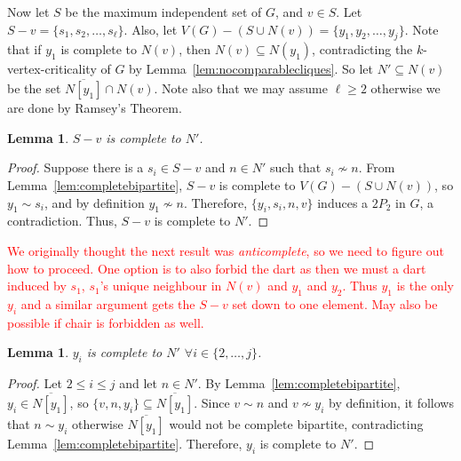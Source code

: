\documentclass[11pt]{article}
\newtheorem{lemma}[theorem]{Lemma}
\theoremstyle{definition}
\begin{document}

Now let $S$ be the maximum independent set of $G$, and $v \in S$. Let $S - v = \{s_1, s_2, \dots, s_{\ell}\}$. Also, let $V(G) - (S \cup N(v)) = \{y_1, y_2, \dots, y_j\}$. Note that if $y_1$ is complete to $N(v)$, then $N(v)\subseteq N(y_1)$, contradicting the $k$-vertex-criticality of $G$ by Lemma~\ref{lem:nocomparablecliques}. So let $N' \subseteq N(v)$ be the set $\overline{N[y_1]}\cap N(v)$. Note also that we may assume $\ell\ge 2$ otherwise we are done by Ramsey's Theorem. 


\begin{lemma}\label{lem:S-vcompletetoN'}
$S-v$ is complete to $N'$.
\end{lemma}
\begin{proof}
Suppose there is a $s_i\in S-v$ and $n\in N'$ such that $s_i\nsim n$. From Lemma~\ref{lem:completebipartite}, $S-v$ is complete to $V(G) - (S \cup N(v))$, so $y_1\sim s_i$, and by definition $y_1\nsim n$. Therefore, $\{y_i, s_i, n, v\}$ induces a $2P_2$ in $G$, a contradiction. Thus, $S-v$ is complete to $N'$.
\end{proof}

\textcolor{red}{We originally thought the next result was \textit{anticomplete}, so we need to figure out how to proceed. One option is to also forbid the dart as then we must a dart induced by $s_1$, $s_1$'s unique neighbour in $N(v)$ and $y_1$ and $y_2$. Thus $y_1$ is the only $y_i$ and a similar argument gets the $S-v$ set down to one element. May also be possible if chair is forbidden as well.}
\begin{lemma}\label{lem:yicompletetoN'}
$y_i$ is complete to $N'$ $\forall i \in \{2, \dots, j\}$.
\end{lemma}
\begin{proof}
Let $2\le i\le j$ and let $n\in N'$. By Lemma~\ref{lem:completebipartite}, $y_i\in\overline{N[y_1]}$, so $\{v,n,y_i\}\subseteq \overline{N[y_1]}$. Since $v\sim n$ and $v\nsim y_i$ by definition, it follows that $n\sim y_i$  otherwise $\overline{N[y_1]}$ would not be complete bipartite, contradicting Lemma~\ref{lem:completebipartite}. Therefore, $y_i$ is complete to $N'$.
\end{proof}
\end{document}
